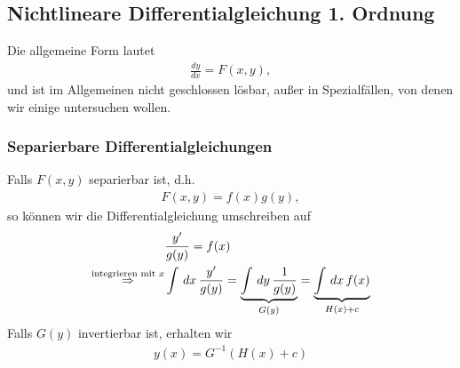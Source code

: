 \subsection{Nichtlineare Differentialgleichung 1. Ordnung}
Die allgemeine Form lautet
\begin{align}
 \frac{dy}{dx} =  F(x,y),
\end{align}
und ist im Allgemeinen nicht geschlossen lösbar, außer in Spezialfällen, von
denen wir einige untersuchen wollen.

\subsubsection{Separierbare Differentialgleichungen}
Falls $F(x,y)$ separierbar ist, d.h.
\begin{align*}
 F(x,y) = f(x) g(y),
\end{align*}
so können wir die Differentialgleichung umschreiben auf
\begin{align*}
 & \frac{y'}{g(y)} = f(x)\\
  \overset{\text{integrieren mit }x}{\Rightarrow} &
\int \,dx\, \frac{y'}{g(y)} = \underbrace{\int \,dy\, \frac{1}{g(y)}}_{G(y)} = \underbrace{\int \,dx\, f(x)}_{H(x)+c}
\end{align*}
Falls $G(y)$ invertierbar ist, erhalten wir
\begin{align*}
 y(x) = G^{-1}(H(x)+c)
\end{align*}

